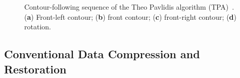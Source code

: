 \documentclass[sensors,article,accept,moreauthors,pdftex,10pt,a4paper]{mdpi}
\begin{document}
\begin{figure}[H]
	\centering
	 
	\caption{Contour-following sequence of the Theo Pavlidis algorithm (TPA)~\cite{Cheong2012Advanced}. (\textbf{a}) Front-left contour; (\textbf{b}) front contour; (\textbf{c}) front-right contour; (\textbf{d}) rotation.}
	\label{fig:image6}
\end{figure}

\subsection{Conventional Data Compression and Restoration}
\end{document}
